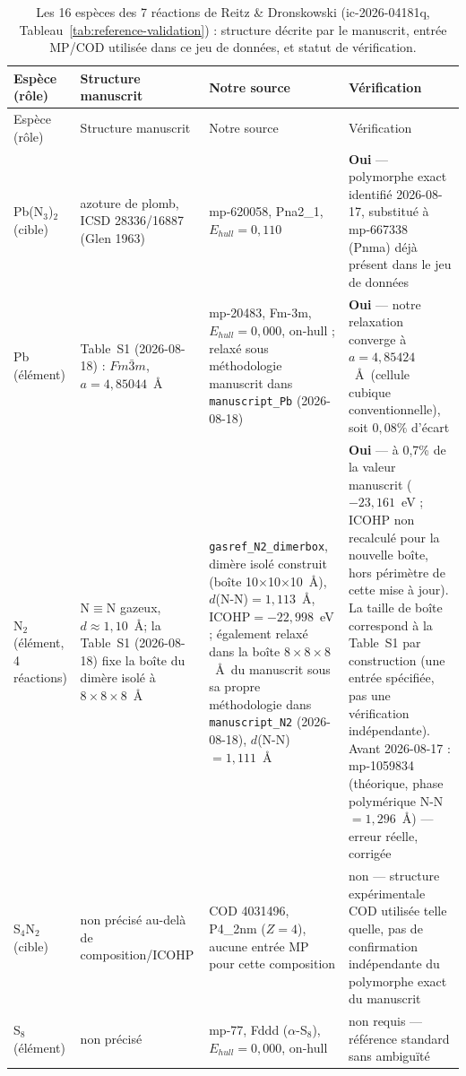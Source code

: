 \begin{longtable}{@{}p{2.6cm} p{3.0cm} p{3.6cm} p{5.2cm}@{}}
\caption{Les 16 espèces des 7 réactions de Reitz \& Dronskowski (ic-2026-04181q, Tableau~\ref{tab:reference-validation}) : structure décrite par le manuscrit, entrée MP/COD utilisée dans ce jeu de données, et statut de vérification.}\label{tab:reitz-dronskowski-structures}\\
\toprule
Espèce (rôle) & Structure manuscrit & Notre source & Vérification \\
\midrule
\endfirsthead
\toprule
Espèce (rôle) & Structure manuscrit & Notre source & Vérification \\
\midrule
\endhead
\bottomrule
\endfoot
Pb(N$_3$)$_2$ (cible) & azoture de plomb, ICSD 28336/16887 (Glen 1963) & mp-620058, Pna2\_1, $E_{hull}=0{,}110$ & \textbf{Oui} --- polymorphe exact identifié 2026-08-17, substitué à mp-667338 (Pnma) déjà présent dans le jeu de données \\
\midrule
Pb (élément) & Table~S1 (2026-08-18) : $Fm\bar{3}m$, $a=4{,}85044$~\AA & mp-20483, Fm-3m, $E_{hull}=0{,}000$, on-hull ; relaxé sous méthodologie manuscrit dans \texttt{manuscript\_Pb} (2026-08-18) & \textbf{Oui} --- notre relaxation converge à $a=4{,}85424$~\AA\ (cellule cubique conventionnelle), soit $0{,}08\%$ d'écart \\
\midrule
N$_2$ (élément, 4 réactions) & N$\equiv$N gazeux, $d\approx1{,}10$~\AA ; la Table~S1 (2026-08-18) fixe la boîte du dimère isolé à $8\times8\times8$~\AA & \texttt{gasref\_N2\_dimerbox}, dimère isolé construit (boîte 10$\times$10$\times$10~\AA), $d$(N-N)$=1{,}113$~\AA, ICOHP$=-22{,}998$~eV ; également relaxé dans la boîte $8\times8\times8$~\AA\ du manuscrit sous sa propre méthodologie dans \texttt{manuscript\_N2} (2026-08-18), $d$(N-N)$=1{,}111$~\AA & \textbf{Oui} --- à 0,7\% de la valeur manuscrit ($-23{,}161$~eV ; ICOHP non recalculé pour la nouvelle boîte, hors périmètre de cette mise à jour). La taille de boîte correspond à la Table~S1 par construction (une entrée spécifiée, pas une vérification indépendante). Avant 2026-08-17 : mp-1059834 (théorique, phase polymérique N-N$=1{,}296$~\AA) --- erreur réelle, corrigée \\
\midrule
S$_4$N$_2$ (cible) & non précisé au-delà de composition/ICOHP & COD 4031496, P4\_2nm ($Z=4$), aucune entrée MP pour cette composition & non --- structure expérimentale COD utilisée telle quelle, pas de confirmation indépendante du polymorphe exact du manuscrit \\
\midrule
S$_8$ (élément) & non précisé & mp-77, Fddd ($\alpha$-S$_8$), $E_{hull}=0{,}000$, on-hull & non requis --- référence standard sans ambiguïté \\

\end{longtable}
